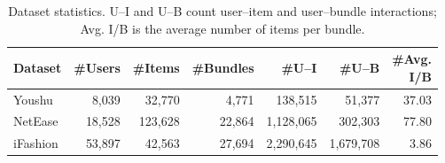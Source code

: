 \documentclass[letterpaper]{article}
\begin{document}
\begin{table}[!b]
    \centering
    {\small
    \setlength{\tabcolsep}{2pt}
    \begin{tabular}{@{}lrrrrrr@{}}
        \toprule
        Dataset
        & \#Users
        & \#Items
        & \#Bundles
        & \#U--I
        & \#U--B
        & \shortstack{\#Avg.\\I/B} \\
        \midrule
        Youshu
        & 8,039
        & 32,770
        & 4,771
        & 138,515
        & 51,377
        & 37.03 \\
        NetEase
        & 18,528
        & 123,628
        & 22,864
        & 1,128,065
        & 302,303
        & 77.80 \\
        iFashion
        & 53,897
        & 42,563
        & 27,694
        & 2,290,645
        & 1,679,708
        & 3.86 \\
        \bottomrule
    \end{tabular}
    }

    \caption{Dataset statistics. U--I and U--B count user--item
    and user--bundle interactions; Avg. I/B is the average
    number of items per bundle.}
    \label{tab:datasets}
\end{table}
\end{document}

